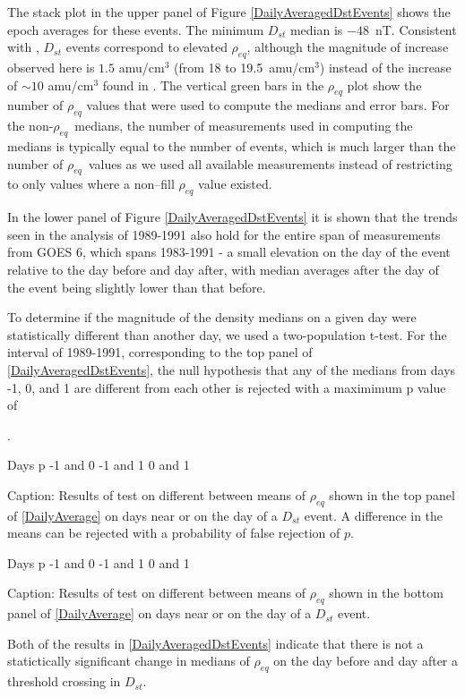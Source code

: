 \documentclass[10pt,twocolumn]{article}
\def\vnote#1\par{\textcolor{red}{\textbf{#1}}\\} %
\newcommand{\req}{\ensuremath{\rho_{eq}}}
\begin{document}
The stack plot in the upper panel of Figure \ref{DailyAveragedDstEvents} shows the epoch averages for these events.  The minimum $D_{st}$ median is $-48$~nT.  Consistent with \cite{Takahashi2010}, $D_{st}$ events correspond to elevated $\rho_{eq}$, although the magnitude of increase observed here is $1.5$ amu/cm$^3$ (from 18 to 19.5~amu/cm$^3$) instead of the increase of $\sim 10$ amu/cm$^3$ found in \cite{Takahashi2010}.  The vertical green bars in the $\rho_{eq}$ plot show the number of $\rho_{eq}$ values that were used to compute the medians and error bars.  For the non-\req\ medians, the number of measurements used in computing the medians is typically equal to the number of events, which is much larger than the number of \req\ values as we used all available measurements instead of restricting to only values where a non--fill $\rho_{eq}$ value existed.

In the lower panel of Figure \ref{DailyAveragedDstEvents} it is shown that the trends seen in the analysis of 1989-1991 also hold for the entire span of measurements from GOES 6, which spans 1983-1991 - a small elevation on the day of the event relative to the day before and day after, with median averages after the day of the event being slightly lower than that before.  

To determine if the magnitude of the density medians on a given day were statistically different than another day, we used a two-population t-test.  For the interval of 1989-1991, corresponding to the top panel of \ref{DailyAveragedDstEvents}, the null hypothesis that any of the medians from days -1, 0, and 1 are different from each other is rejected with a maximimum p value of \vnote{??}.

   Days     p
-1 and 0
-1 and 1
 0 and 1

Caption: Results of test on different between means of $\rho_{eq}$ shown in the top panel of \ref{DailyAverage} on days near or on the day of a $D_{st}$ event.  A difference in the means can be rejected with a probability of false rejection of $p$.

   Days     p
-1 and 0
-1 and 1
 0 and 1

Caption: Results of test on different between means of $\rho_{eq}$ shown in the bottom panel of \ref{DailyAverage} on days near or on the day of a $D_{st}$ event.  

Both of the results in \ref{DailyAveragedDstEvents} indicate that there is not a statictically significant change in medians of $\rho_{eq}$ on the day before and day after a threshold crossing in $D_{st}$.  
\end{document}
